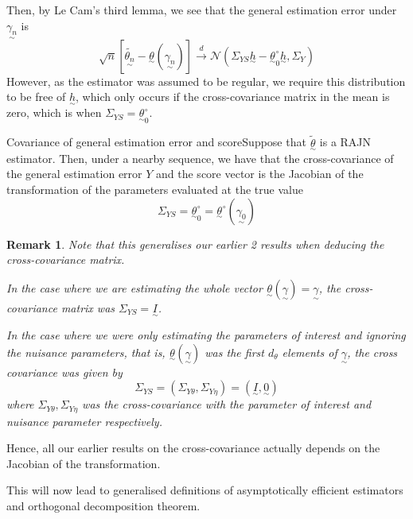\documentclass[twoside]{article}
\newtheorem{remark}[theorem]{Remark}
\newcommand{\utilde}{\underset{\sim}}
\begin{document}
Then, by Le Cam's third lemma, we see that the general estimation error under $\utilde{\gamma_n}$ is
$$
\sqrt{n}[\tilde{\utilde{\theta_n}} - \utilde{\theta}(\utilde{\gamma_n})] \xrightarrow{d} \mathcal{N}(\Sigma_{YS}\utilde{h} - \utilde{\theta}_0^{\circ}\utilde{h}, \Sigma_Y)
$$
However, as the estimator was assumed to be regular, we require this distribution to be free of $\utilde{h}$, which only occurs if the cross-covariance matrix in the mean is zero, which is when $\Sigma_{YS} = \utilde{\theta}_0^{\circ}.$

\begin{proposition_exam}{Covariance of general estimation error and score}{}Suppose that $\tilde{\utilde{\theta}}$ is a RAJN estimator. Then, under a nearby sequence, we have that the cross-covariance of the general estimation error $Y$ and the score vector is the Jacobian of the transformation of the parameters evaluated at the true value 
$$\Sigma_{YS} = \utilde{\theta}_0^{\circ} = \utilde{\theta}^{\circ}(\utilde{\gamma_0})$$
\end{proposition_exam}

\begin{remark}Note that this generalises our earlier 2 results when deducing the cross-covariance matrix.

In the case where we are estimating the whole vector $\utilde{\theta}(\utilde{\gamma}) = \utilde{\gamma}$, the cross-covariance matrix was $\Sigma_{YS} = \utilde{I}$.

In the case where we were only estimating the parameters of interest and ignoring the nuisance parameters, that is, $\utilde{\theta}(\utilde{\gamma})$ was the first $d_{\theta}$ elements of $\utilde{\gamma}$, the cross covariance was given by 
$$
\Sigma_{YS} = (\Sigma_{Y \theta},\Sigma_{Y \eta}) = (\utilde{I}, \utilde{0})
$$
where $\Sigma_{Y \theta},\Sigma_{Y \eta}$ was the cross-covariance with the parameter of interest and nuisance parameter respectively.
\end{remark}

Hence, all our earlier results on the cross-covariance actually depends on the Jacobian of the transformation.

This will now lead to generalised definitions of asymptotically efficient estimators and orthogonal decomposition theorem.
\end{document}
